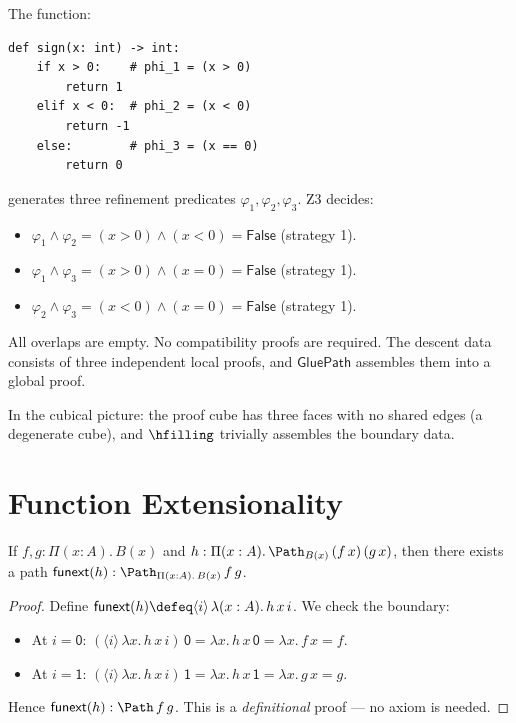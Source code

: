 \begin{example}
The function:
\begin{verbatim}
def sign(x: int) -> int:
    if x > 0:    # phi_1 = (x > 0)
        return 1
    elif x < 0:  # phi_2 = (x < 0)
        return -1
    else:        # phi_3 = (x == 0)
        return 0
\end{verbatim}
generates three refinement predicates $\varphi_1, \varphi_2, \varphi_3$.
Z3 decides:
\begin{itemize}
\item $\varphi_1 \wedge \varphi_2 = (x > 0) \wedge (x < 0) = \mathsf{False}$ \quad (strategy 1).
\item $\varphi_1 \wedge \varphi_3 = (x > 0) \wedge (x = 0) = \mathsf{False}$ \quad (strategy 1).
\item $\varphi_2 \wedge \varphi_3 = (x < 0) \wedge (x = 0) = \mathsf{False}$ \quad (strategy 1).
\end{itemize}
All overlaps are empty.  No compatibility proofs are required.  The descent
data consists of three independent local proofs, and $\mathsf{GluePath}$
assembles them into a global proof.

In the cubical picture: the proof cube has three faces with no shared edges
(a degenerate cube), and $\hfilling$ trivially assembles the boundary data.
\end{example}


\section{Function Extensionality}
\label{sec:c4-funext}

\begin{theorem}
\label{thm:c4-funext}
If $f, g : \Pi(x : A).\, B(x)$ and
$h : \Pi(x : A).\, \Path_{B(x)}\, (f\,x)\, (g\,x)$, then
there exists a path $\mathsf{funext}(h) : \Path_{\Pi(x:A).\,B(x)}\, f\, g$.
\end{theorem}

\begin{proof}
Define $\mathsf{funext}(h) \defeq \langle i \rangle\, \lambda(x : A).\,
h\,x\,i$.  We check the boundary:
\begin{itemize}
\item At $i = \mathsf{0}$:
  $(\langle i \rangle\, \lambda x.\, h\,x\,i)\,\mathsf{0}
   = \lambda x.\, h\,x\,\mathsf{0}
   = \lambda x.\, f\,x = f$.
\item At $i = \mathsf{1}$:
  $(\langle i \rangle\, \lambda x.\, h\,x\,i)\,\mathsf{1}
   = \lambda x.\, h\,x\,\mathsf{1}
   = \lambda x.\, g\,x = g$.
\end{itemize}
Hence $\mathsf{funext}(h) : \Path\, f\, g$.  This is a
\emph{definitional} proof --- no axiom is needed.
\end{proof}

